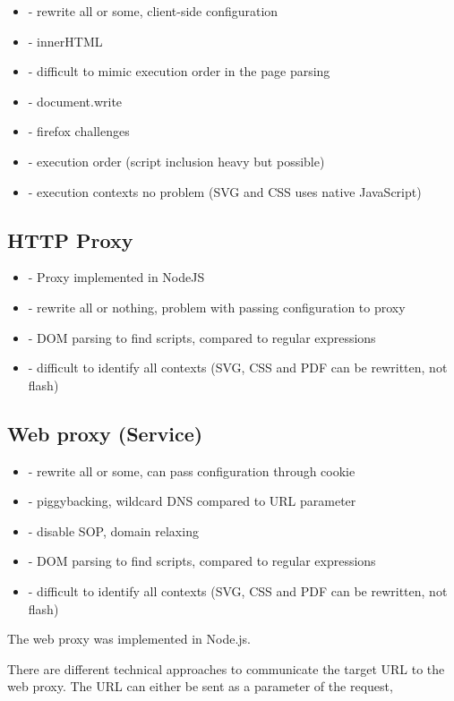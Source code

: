 \documentclass{llncs}
\begin{document}
\begin{itemize}
\item- rewrite all or some, client-side configuration
\item- innerHTML
\item- difficult to mimic execution order in the page parsing
\item- document.write
\item- firefox challenges
\item- execution order (script inclusion heavy but possible)
\item- execution contexts no problem (SVG and CSS uses native JavaScript)
\end{itemize}

\subsection{HTTP Proxy}

\begin{itemize}
\item- Proxy implemented in NodeJS
\item- rewrite all or nothing, problem with passing configuration to proxy
\item- DOM parsing to find scripts, compared to regular expressions
\item- difficult to identify all contexts (SVG, CSS and PDF can be rewritten, not flash)
\end{itemize}



\subsection{Web proxy (Service)}

\begin{itemize}
\item- rewrite all or some, can pass configuration through cookie
\item- piggybacking, wildcard DNS compared to URL parameter
\item- disable SOP, domain relaxing
\item- DOM parsing to find scripts, compared to regular expressions
\item- difficult to identify all contexts (SVG, CSS and PDF can be rewritten, not flash)
\end{itemize}

The web proxy was implemented in Node.js. 

There are different technical approaches to communicate the target URL to the web 
proxy. The URL can either be sent as a parameter of the request, 
\end{document}
